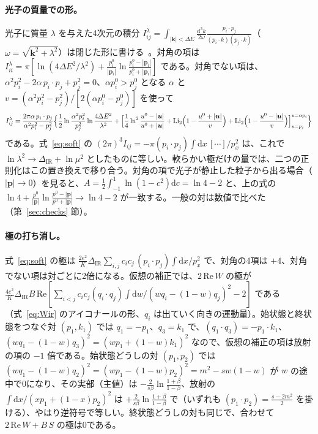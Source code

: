 \documentclass[a4paper,10pt]{ltjsarticle}
\newcommand{\dd}{\mathrm{d}}
\newcommand{\DIR}{\Delta_{\mathrm{IR}}}
\begin{document}
\paragraph{光子の質量での形。}光子に質量 $\lambda$ を与えた4次元の積分 $I^\lambda_{ij}=\int_{|\boldsymbol k|<\Delta E}\frac{\dd^3k}{2\omega}\frac{p_i\cdot p_j}{(p_i\cdot k)(p_j\cdot k)}$（$\omega=\sqrt{\boldsymbol k^2+\lambda^2}$）は閉じた形に書ける~\cite{thv79,denner93}。対角の項は $I^\lambda_{ii}=\pi[\ln(4\Delta E^2/\lambda^2)+\frac{p_i^0}{|\boldsymbol p_i|}\ln\frac{p_i^0-|\boldsymbol p_i|}{p_i^0+|\boldsymbol p_i|}]$ である。対角でない項は、$\alpha^2p_i^2-2\alpha\,p_i\cdot p_j+p_j^2=0$、$\alpha p_i^0>p_j^0$ となる $\alpha$ と $v=(\alpha^2p_i^2-p_j^2)/[2(\alpha p_i^0-p_j^0)]$ を使って
\begin{equation*}
I^\lambda_{ij}=\frac{2\pi\alpha\,p_i\cdot p_j}{\alpha^2p_i^2-p_j^2}\Bigl\{\frac12\ln\frac{\alpha^2p_i^2}{p_j^2}\ln\frac{4\Delta E^2}{\lambda^2}+\Bigl[\frac14\ln^2\frac{u^0-|\boldsymbol u|}{u^0+|\boldsymbol u|}+\mathrm{Li}_2\Bigl(1-\frac{u^0+|\boldsymbol u|}{v}\Bigr)+\mathrm{Li}_2\Bigl(1-\frac{u^0-|\boldsymbol u|}{v}\Bigr)\Bigr]_{u=p_j}^{u=\alpha p_i}\Bigr\}
\end{equation*}
である。式~\eqref{eq:soft} の $(2\pi)^3I_{ij}=-\pi(p_i\cdot p_j)\int\dd x\,[\cdots]/p_x^2$ は、これで $\ln\lambda^2\to\DIR+\ln\mu^2$ としたものに等しい。軟らかい極だけの量では、二つの正則化はこの置き換えで移り合う。対角の項で光子が静止した粒子から出る場合（$|\boldsymbol p|\to0$）を見ると、$A=\frac12\int_{-1}^1\ln(1-c^2)\dd c=\ln4-2$ と、上の式の $\ln4+\frac{p^0}{|\boldsymbol p|}\ln\frac{p^0-|\boldsymbol p|}{p^0+|\boldsymbol p|}\to\ln4-2$ が一致する。一般の対は数値で比べた（第~\ref{sec:checks} 節）。

\paragraph{極の打ち消し。}式~\eqref{eq:soft} の極は $\frac{2e^2}{K}\DIR\sum_{i,j}c_ic_j\,(p_i\cdot p_j)\int\dd x/p_x^2$ で、対角の4項は $+4$、対角でない項は対ごとに2倍になる。仮想の補正では、$2\,\mathrm{Re}\,W$ の極が $\frac{4e^2}{K}\DIR B\,\mathrm{Re}[\sum_{i<j}c_ic_j(q_i\cdot q_j)\int\dd w/(wq_i-(1-w)q_j)^2-2]$ である（式~\eqref{eq:Wir} のアイコナールの形、$q_i$ は出ていく向きの運動量）。始状態と終状態をつなぐ対 $(p_1,k_1)$ では $q_1=-p_1$、$q_3=k_1$ で、$(q_1\cdot q_3)=-p_1\cdot k_1$、$(wq_1-(1-w)q_3)^2=(wp_1+(1-w)k_1)^2$ なので、仮想の補正の項は放射の項の $-1$ 倍である。始状態どうしの対 $(p_1,p_2)$ では $(wq_1-(1-w)q_2)^2=(wp_1-(1-w)p_2)^2=m^2-sw(1-w)$ が $w$ の途中で0になり、その実部（主値）は $-\frac{2}{s\beta}\ln\frac{1+\beta}{1-\beta}$、放射の $\int\dd x/(xp_1+(1-x)p_2)^2$ は $+\frac{2}{s\beta}\ln\frac{1+\beta}{1-\beta}$ で（いずれも $(p_1\cdot p_2)=\frac{s-2m^2}{2}$ を掛ける）、やはり逆符号で等しい。終状態どうしの対も同じで、合わせて $2\,\mathrm{Re}\,W+B\,S$ の極は0である。
\end{document}
